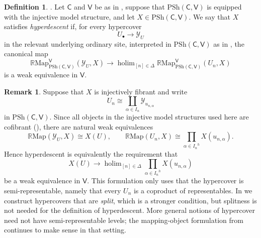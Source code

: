\documentclass{amsart}
\newcommand{\cat}[1]{\mathsf{#1}}
\DeclareMathOperator*{\holim}{holim}
\newcommand{\Map}{\mathrm{Map}}
\newcommand{\psh}{\mathrm{PSh}}
\newcommand{\Yo}{\mathscr{Y}}
\theoremstyle{definition}
\newtheorem{definition}[equation]{Definition}
\newtheorem{remark}[equation]{Remark}
\numberwithin{equation}{subsection}
\numberwithin{subsubsection}{subsection}
\begin{document}
\begin{definition}\label{def:hyperdescent}
  \textnormal{\cite[Definition~4.3 and Theorem~1.1]{DHI04}}.
  Let \(\cat{C}\) and \(\cat{V}\) be as in
  , suppose that
  \(\psh(\cat{C},\cat{V})\) is equipped with the injective model structure,
  and let \(X\in\psh(\cat{C},\cat{V})\). We say that \(X\) satisfies
  \emph{hyperdescent} if, for every hypercover
  \[
    U_{\bullet}\longrightarrow\Yo_U
  \]
  in the relevant underlying ordinary site, interpreted in
  \(\psh(\cat{C},\cat{V})\) as in , the canonical map
  \[
    \mathbb{R}\Map_{\psh(\cat{C},\cat{V})}^{\cat{V}}(\Yo_{U},X)
    \longrightarrow
    \holim_{[n]\in\Delta}
    \mathbb{R}\Map_{\psh(\cat{C},\cat{V})}^{\cat{V}}(U_n,X)
  \]
  is a weak equivalence in \(\cat{V}\).
\end{definition}

\begin{remark}\label{rem:hyperdescent.coproduct.representables}
  Suppose that \(X\) is injectively fibrant and write
  \[
    U_n\cong
    \coprod_{\alpha\in I_n}\Yo_{u_{n,\alpha}}
  \]
  in \(\psh(\cat{C},\cat{V})\). Since all objects in the injective model
  structures used here are cofibrant
  (), there are natural weak
  equivalences
  \[
    \mathbb{R}\Map(\Yo_U,X)\cong X(U),
    \qquad
    \mathbb{R}\Map(U_n,X)
    \cong
    \prod_{\alpha\in I_n}\nolimits^h X(u_{n,\alpha}).
  \]
  Hence hyperdescent is equivalently the requirement that
  \[
    X(U)
    \longrightarrow
    \holim_{[n]\in\Delta}
    \prod_{\alpha\in I_n}\nolimits^h X(u_{n,\alpha})
  \]
  be a weak equivalence in \(\cat{V}\). This formulation only uses that
  the hypercover is semi-representable, namely that every \(U_n\) is a
  coproduct of representables. In  we
  construct hypercovers that are \emph{split}, which is a
  stronger condition, but splitness is not needed for the definition of
  hyperdescent.
  More general notions of hypercover need not have semi-representable
  levels; the mapping-object formulation from  continues
  to make sense in that
  setting.
\end{remark}
\end{document}
